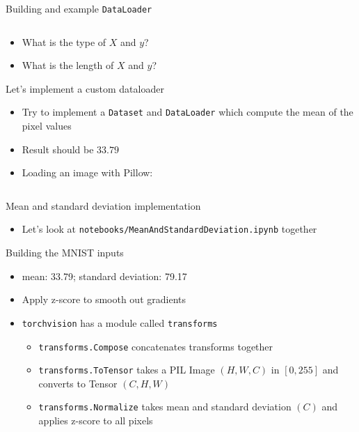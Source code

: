 \documentclass[hyperref={pdfpagelabels=false},12pt]{beamer}
\newcommand{\code}[2]{\texttt{#2}}
\newcommand{\python}[1]{\code{python}{#1}}
\newcommand{\pygment}[3]{\inputminted[bgcolor=lightgray,linenos,fontsize=#1]{#2}{#3}}
\begin{document}
\begin{frame}{Building and example \python{DataLoader}}
  \pygment{\scriptsize}{python}{code/basic-dataloader.py}
  \vspace{-0.5cm}
  \begin{itemize}
    \item What is the type of $X$ and $y$?
    \item What is the length of $X$ and $y$?
  \end{itemize}
\end{frame}

\begin{frame}{Let's implement a custom dataloader}
  \begin{itemize}
    \item Try to implement a \python{Dataset} and \python{DataLoader} which
      compute the mean of the pixel values
    \item Result should be $33.79$
    \item Loading an image with Pillow:
  \end{itemize}
  \pygment{\scriptsize}{python}{code/pil-open.py}
\end{frame}

\begin{frame}{Mean and standard deviation implementation}
  \begin{itemize}
    \item Let's look at \texttt{notebooks/MeanAndStandardDeviation.ipynb} together
  \end{itemize}
\end{frame}

\begin{frame}{Building the MNIST inputs}
  \begin{itemize}
    \item mean: 33.79; standard deviation: 79.17
    \item Apply z-score to smooth out gradients
    \item \texttt{torchvision} has a module called \texttt{transforms}
    \begin{itemize}
      \item \python{transforms.Compose} concatenates transforms together
      \item \python{transforms.ToTensor} takes a PIL Image $(H, W, C)$
        in $[0, 255]$ and converts to Tensor $(C, H, W)$
      \item \python{transforms.Normalize} takes mean and standard deviation
        $(C)$ and applies z-score to all pixels
    \end{itemize}
  \end{itemize}
\end{frame}
\end{document}

